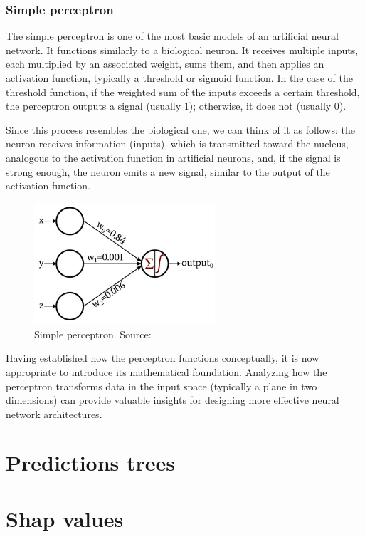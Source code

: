 \subsubsection{Simple perceptron}

The simple perceptron is one of the most basic models of an artificial neural network. It functions similarly to a biological neuron. It receives multiple inputs, each multiplied by an associated weight, sums them, and then applies an activation function, typically a threshold or sigmoid function. In the case of the threshold function, if the weighted sum of the inputs exceeds a certain threshold, the perceptron outputs a signal (usually 1); otherwise, it does not (usually 0). 

Since this process resembles the biological one, we can think of it as follows: the neuron receives information (inputs), which is transmitted toward the nucleus, analogous to the activation function in artificial neurons, and, if the signal is strong enough, the neuron emits a new signal, similar to the output of the activation function.

\begin{figure}[h!]
    \centering
    \includegraphics[width=0.6\textwidth]{figures/simple_perceptron.png}
    \caption{Simple perceptron. Source: \cite{simplePerceptron}}
    \label{fig:simplePerceptron}
\end{figure}

Having established how the perceptron functions conceptually, it is now appropriate to introduce its mathematical foundation. Analyzing how the perceptron transforms data in the input space (typically a plane in two dimensions) can provide valuable insights for designing more effective neural network architectures.

\section{Predictions trees}


\section{Shap values}